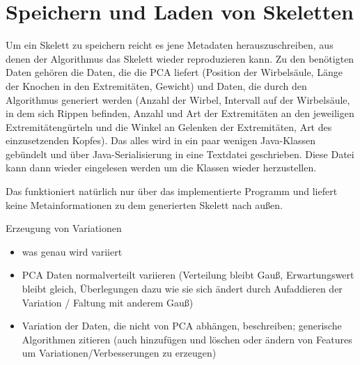 \section{Speichern und Laden von Skeletten}

Um ein Skelett zu speichern reicht es jene Metadaten herauszuschreiben, aus denen der Algorithmus das Skelett wieder reproduzieren kann. Zu den benötigten Daten gehören die Daten, die die PCA liefert (Position der Wirbelsäule, Länge der Knochen in den Extremitäten, Gewicht) und Daten, die durch den Algorithmus generiert werden (Anzahl der Wirbel, Intervall auf der Wirbelsäule, in dem sich Rippen befinden, Anzahl und Art der Extremitäten an den jeweiligen Extremitätengürteln und die Winkel an Gelenken der Extremitäten, Art des einzusetzenden Kopfes).
Das alles wird in ein paar wenigen Java-Klassen gebündelt und über Java-Serialisierung in eine Textdatei geschrieben. Diese Datei kann dann wieder eingelesen werden um die Klassen wieder herzustellen.

Das funktioniert natürlich nur über das implementierte Programm und liefert keine Metainformationen zu dem generierten Skelett nach außen.


Erzeugung von Variationen 
\begin{itemize}
 \item was genau wird variiert
 \item PCA Daten normalverteilt variieren (Verteilung bleibt Gauß, Erwartungswert bleibt gleich, Überlegungen dazu wie sie sich ändert durch Aufaddieren der Variation / Faltung mit anderem Gauß)
 \item Variation der Daten, die nicht von PCA abhängen, beschreiben; generische Algorithmen zitieren (auch hinzufügen und löschen oder ändern von Features um Variationen/Verbesserungen zu erzeugen)
\end{itemize}

